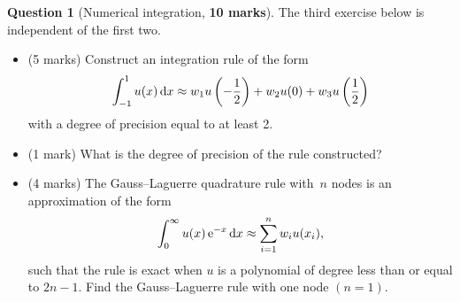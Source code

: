 \documentclass[11pt]{article}
\theoremstyle{definition}
\newtheorem{question}{Question}
\begin{document}
\newpage
\begin{question}
    [Numerical integration, \textbf{10 marks}]
    The third exercise below is independent of the first two.
    \begin{itemize}
        \item (5 marks)
            Construct an integration rule of the form
            \[
                \int_{-1}^{1} u(x) \, \mathrm d x \approx w_1 u\left(-\frac{1}{2} \right) + w_2 u(0) +  w_3 u\left(\frac{1}{2} \right)
            \]
            with a degree of precision equal to at least 2.

        \item
            (1 mark)
            What is the degree of precision of the rule constructed?

        \item (4 marks)
            The Gauss--Laguerre quadrature rule with~$n$ nodes is an approximation of the form
            \[
                \int_{0}^{\infty} u(x) \, \mathrm e^{-x} \, \mathrm d x \approx \sum_{i=1}^{n} w_i u(x_i),
            \]
            such that the rule is exact when $u$ is a polynomial of degree less than or equal to $2n-1$.
            Find the Gauss--Laguerre rule with one node $(n = 1)$.
    \end{itemize}
\end{question}
\end{document}
